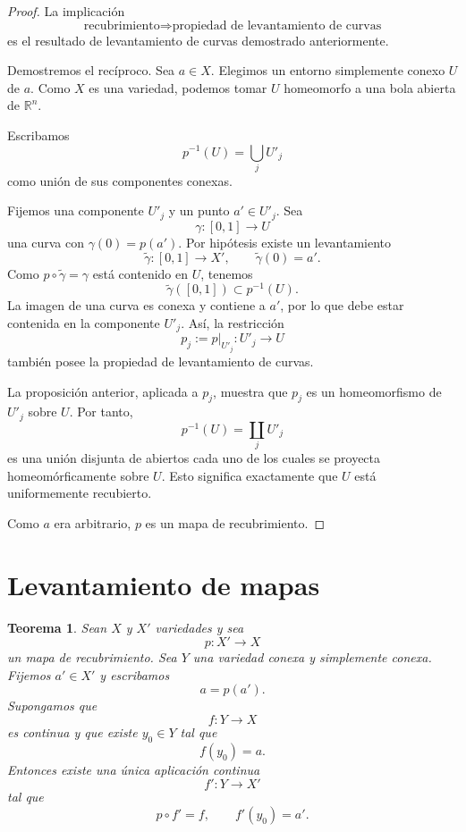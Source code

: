 \documentclass[11pt,a4paper]{article}
\theoremstyle{definition}
\theoremstyle{plain}
\newtheorem{teorema}{Teorema}[section]
\theoremstyle{remark}
\newcommand{\R}{\mathbb R}
\newcommand{\I}{[0,1]}
\newcommand{\restr}[2]{\left.#1\right|_{#2}}
\begin{document}
\begin{proof}
La implicación
\[
\text{recubrimiento}\Longrightarrow
\text{propiedad de levantamiento de curvas}
\]
es el resultado de levantamiento de curvas demostrado anteriormente.

Demostremos el recíproco. Sea $a\in X$. Elegimos un entorno simplemente
conexo $U$ de $a$. Como $X$ es una variedad, podemos tomar $U$
homeomorfo a una bola abierta de $\R^n$.

Escribamos
\[
p^{-1}(U)=\bigcup_j U'_j
\]
como unión de sus componentes conexas.

Fijemos una componente $U'_j$ y un punto $a'\in U'_j$. Sea
\[
\gamma:\I\longrightarrow U
\]
una curva con $\gamma(0)=p(a')$. Por hipótesis existe un levantamiento
\[
\widetilde\gamma:\I\longrightarrow X',
\qquad
\widetilde\gamma(0)=a'.
\]
Como $p\circ\widetilde\gamma = \gamma$ está contenido en $U$, tenemos
\[
\widetilde\gamma(\I)\subset p^{-1}(U).
\]
La imagen de una curva es conexa y contiene a $a'$, por lo que debe
estar contenida en la componente $U'_j$. Así, la restricción
\[
p_j:=\restr{p}{U'_j}:U'_j\longrightarrow U
\]
también posee la propiedad de levantamiento de curvas.

La proposición anterior, aplicada a $p_j$, muestra que $p_j$ es un
homeomorfismo de $U'_j$ sobre $U$. Por tanto,
\[
p^{-1}(U)=\coprod_j U'_j
\]
es una unión disjunta de abiertos cada uno de los cuales se proyecta
homeomórficamente sobre $U$. Esto significa exactamente que $U$ está
uniformemente recubierto.

Como $a$ era arbitrario, $p$ es un mapa de recubrimiento.
\end{proof}

\section{Levantamiento de mapas}

\begin{teorema}
Sean $X$ y $X'$ variedades y sea
\[
p:X'\longrightarrow X
\]
un mapa de recubrimiento. Sea $Y$ una variedad conexa y simplemente
conexa. Fijemos $a'\in X'$ y escribamos
\[
a=p(a').
\]
Supongamos que
\[
f:Y\longrightarrow X
\]
es continua y que existe $y_0\in Y$ tal que
\[
f(y_0)=a.
\]
Entonces existe una única aplicación continua
\[
f':Y\longrightarrow X'
\]
tal que
\[
p\circ f'=f,
\qquad
f'(y_0)=a'.
\]
\end{teorema}
\end{document}
